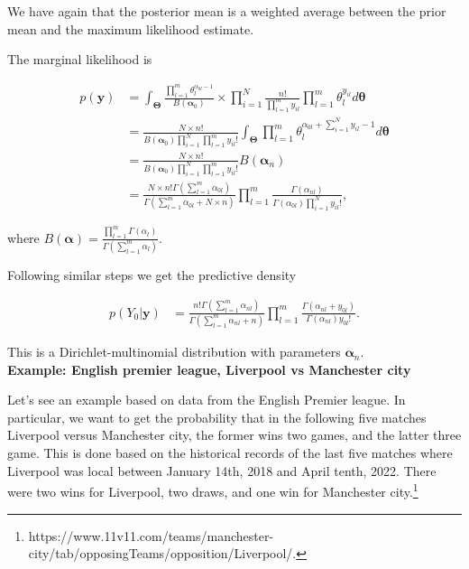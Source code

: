 \begin{enumerate}
We have again that the posterior mean is a weighted average between the prior mean and the maximum likelihood estimate.

The marginal likelihood is

\begin{align}
	p(\mathbf{y})&=\int_{\mathbf{\Theta}}\frac{\prod_{l=1}^m \theta_l^{\alpha_{0l}-1}}{B(\bm{\alpha}_0)}\times \prod_{i=1}^N\frac{n!}{\prod_{l=1}^m y_{il}}\prod_{l=1}^m \theta_{l}^{y_{il}}d\bm{\theta}\nonumber\\
	&=\frac{N\times n!}{B(\bm{\alpha}_0)\prod_{i=1}^N\prod_{l=1}^m y_{il}!}\int_{\mathbf{\Theta}} \prod_{l=1}^m \theta_l^{\alpha_{0l}+\sum_{i=1}^N y_{il}-1} d\bm{\theta}\nonumber\\
	&=\frac{N\times n!}{B(\bm{\alpha}_0)\prod_{i=1}^N\prod_{l=1}^m y_{il}!}B(\bm{\alpha}_n)\nonumber\\
	&=\frac{N\times n! \Gamma\left(\sum_{l=1}^m\nonumber \alpha_{0l}\right)}{\Gamma\left(\sum_{l=1}^m \alpha_{0l}+N\times n\right)}\prod_{l=1}^m \frac{\Gamma\left( \alpha_{nl}\right)}{\Gamma\left(\alpha_{0l}\right)\prod_{i=1}^N y_{il}!},\nonumber
\end{align}

where $B(\bm{\alpha})=\frac{\prod_{l=1}^m\Gamma(\alpha_l)}{\Gamma\left(\sum_{l=1}^m \alpha_l\right)}$.

Following similar steps we get the predictive density

\begin{align}
	p(Y_0|\mathbf{y})&=\frac{ n! \Gamma\left(\sum_{l=1}^m \alpha_{nl}\right)}{\Gamma\left(\sum_{l=1}^m \alpha_{nl}+ n\right)}\prod_{l=1}^m \frac{\Gamma\left( \alpha_{nl}+y_{0l}\right)}{\Gamma\left(\alpha_{nl}\right) y_{0l}!}.\nonumber
\end{align}

This is a Dirichlet-multinomial distribution with parameters $\bm{\alpha}_n$.\\

\textbf{Example: English premier league, Liverpool vs Manchester city}

Let's see an example based on data from the English Premier league. In particular, we want to get the probability that in the following five matches Liverpool versus Manchester city, the former wins two games, and the latter three game. This is done based on the historical records of the last five matches where Liverpool was local between January 14th, 2018 and April tenth, 2022. There were two wins for Liverpool, two draws, and one win for Manchester city.\footnote{https://www.11v11.com/teams/manchester-city/tab/opposingTeams/opposition/Liverpool/.}


\end{enumerate}

